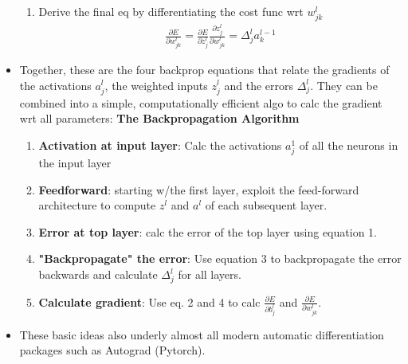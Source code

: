 \documentclass[norsk,a4paper,11pt]{article}
\begin{document}
\begin{itemize}
\begin{enumerate}
		\item Derive the final eq by differentiating the cost func wrt $w_{jk}^l$
		\begin{align}
			\frac{\partial E}{\partial w_{jk}^l} = \frac{\partial E}{\partial z_j^l} \frac{\partial z_j^l}{\partial w_{jk}^l} = \Delta_j^l a_k^{l-1}
		\end{align}
	\end{enumerate}
	\item Together, these are the four backprop equations that relate the gradients of the activations $a_j^l$, the weighted inputs $z_j^l$ and the errors $\Delta_j^l$. They can be combined into a simple, computationally efficient algo to calc the gradient wrt all parameters: \textbf{The Backpropagation Algorithm}
	\begin{enumerate}
		\item \textbf{Activation at input layer}: Calc the activations $a_j^1$ of all the neurons in the input layer
		\item \textbf{Feedforward}: starting w/the first layer, exploit the feed-forward architecture to compute $z^l$ and $a^l$ of each subsequent layer.
		\item \textbf{Error at top layer}: calc the error of the top layer using equation 1.
		\item \textbf{"Backpropagate" the error}: Use equation 3 to backpropagate the error backwards and calculate $\Delta_j^l$ for all layers.
		\item \textbf{Calculate gradient}: Use eq. 2 and 4 to calc $\frac{\partial E}{\partial b_j^l}$ and $\frac{\partial E}{\partial w_{jk}^l}$.
	\end{enumerate}
	\item These basic ideas also underly almost all modern automatic differentiation packages such as Autograd (Pytorch).
\end{itemize}
\end{document}
